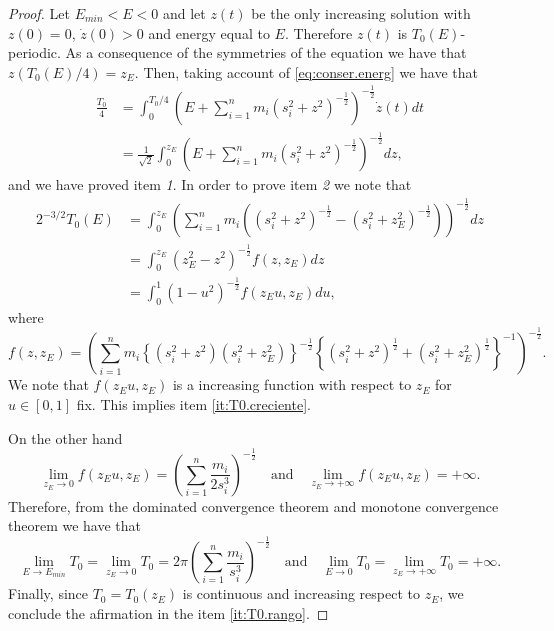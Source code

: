\documentclass[twoside]{article}
\theoremstyle{remark}
\begin{document}
\begin{proof}
Let $E_{min}<E<0$ and let $z(t)$ be the only increasing solution with $z(0)=0$, $\dot{z}(0)>0$ and energy equal to $E$. Therefore $z(t)$ is $T_0(E)$-periodic. As a consequence of the symmetries of the equation we have that $z(T_0(E)/4)=z_E$. Then, taking account of \eqref{eq:conser.energ} we have that
\begin{equation*}
 \begin{split}
  \frac{T_0}{4}&=\int_0^{T_0/4}\left(E+\sum_{i=1}^n m_i (s_i^2+z^2)^{-\frac12}\right)^{-\frac12} \dot{z}(t) dt\\
  &=\frac{1}{\sqrt{2}}\int_{0}^{z_E} \left(E+\sum_{i=1}^n m_i (s_i^2+z^2)^{-\frac12}\right)^{-\frac12} dz,
 \end{split}
\end{equation*}
and we have proved item \textit{1}. In order to prove item \textit{2} we note that
\begin{equation*}
 \begin{split}
  2^{-3/2}T_0(E)
  &=
    \int_0^{z_E}\left(\sum_{i=1}^n m_i \left((s_i^2+z^2)^{-\frac12}-(s_i^2+z_E^2)^{-\frac12}\right)\right)^{-\frac12}dz\\
  &=\int_0^{z_E} \left(z_E^2-z^2\right)^{-\frac12} f(z,z_E)dz\\
  &=\int_0^1 \left(1-u^2\right)^{-\frac12} f(z_Eu,z_E)du,
 \end{split}
 \end{equation*}
where \[f(z,z_E)=\left(\sum_{i=1}^n m_i \left\{(s_i^2+z^2)(s_i^2+z_E^2)\right\}^{-\frac12} \left\{(s_i^2+z^2)^{\frac12}+(s_i^2+z_E^2)^{\frac12} \right\}^{-1}\right)^{-\frac12}.\]
We note that $f(z_Eu,z_E)$ is a increasing function with respect to $z_E$ for $u\in [0,1]$ fix. This implies item \ref{it:T0.creciente}.

On the other hand
\begin{equation*}
 \lim\limits_{z_E \to 0}f(z_Eu,z_E)=\left(\sum_{i=1}^{n} \frac{m_i}{2s_i^3}\right)^{-\frac12} \quad \text{and}\quad  \lim\limits_{z_E \to +\infty}f(z_Eu,z_E)=+\infty.
\end{equation*}
Therefore, from the dominated convergence theorem and monotone convergence theorem we have that
\[\lim\limits_{E\to E_{min}}T_0=\lim\limits_{z_E\to 0}T_0=2\pi\left(\sum_{i=1}^{n} \frac{m_i}{s_i^3}\right)^{-\frac12}\quad \text{and}\quad \lim\limits_{E\to 0}T_0=\lim\limits_{z_E\to +\infty}T_0=+\infty.\]
Finally,  since $T_0=T_0(z_E)$ is continuous and increasing respect to $z_E$, we conclude the afirmation in the item \ref{it:T0.rango}.
\end{proof}
\end{document}
